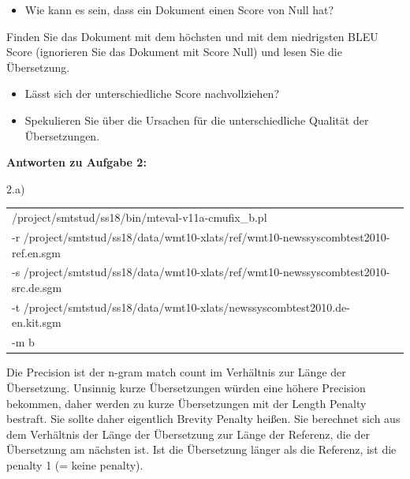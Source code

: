 \documentclass[12pt,fleqn]{article}
\begin{document}
\begin{enumerate}
\begin{enumerate}
\vspace{0.5cm} 
\begin{itemize} 
\item Wie kann es sein, dass ein Dokument einen Score von Null hat?
\end{itemize} 

\vspace{0.5cm} 
Finden Sie das Dokument mit dem höchsten und mit dem niedrigsten BLEU Score (ignorieren Sie das Dokument mit Score Null) und lesen Sie die Übersetzung.

\vspace{0.5cm} 
\begin{itemize} 
\item Lässt sich der unterschiedliche Score nachvollziehen?
\item Spekulieren Sie über die Ursachen für die unterschiedliche Qualität der Übersetzungen.
\end{itemize} 

\end{enumerate} 

\textbf{Antworten zu Aufgabe 2:} 

2.a) \\ 

\begin{table}[h] 
 \begin{center} 
\begin{tabular}{l} 
/project/smtstud/ss18/bin/mteval-v11a-cmufix\_b.pl  \\ 
-r /project/smtstud/ss18/data/wmt10-xlats/ref/wmt10-newssyscombtest2010-ref.en.sgm  \\ 
-s /project/smtstud/ss18/data/wmt10-xlats/ref/wmt10-newssyscombtest2010-src.de.sgm  \\ 
-t /project/smtstud/ss18/data/wmt10-xlats/newssyscombtest2010.de-en.kit.sgm  \\ 
-m b \\ 
\end{tabular}
 \end{center}
\end{table}



Die Precision ist der n-gram match count im Verhältnis zur Länge der Übersetzung. Unsinnig kurze Übersetzungen würden eine höhere Precision bekommen, daher werden zu kurze Übersetzungen mit der Length Penalty bestraft. Sie sollte daher eigentlich Brevity Penalty heißen. Sie berechnet sich aus dem Verhältnis der Länge der Übersetzung zur Länge der Referenz, die der Übersetzung am nächsten ist. Ist die Übersetzung länger als die Referenz, ist die penalty 1 (= keine penalty). 



\end{enumerate}
\end{document}
